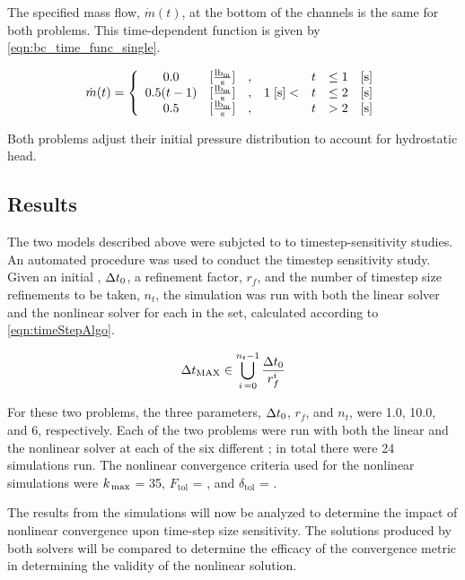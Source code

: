 The specified mass flow, $\dot{m}(t)$, at the bottom of the channels is the same for both problems. 
This time-dependent function is given by \eqref{eqn:bc_time_func_single}.

\begin{equation}
\label{eqn:bc_time_func_single}
\dot{m}(t) = \left\{
\begin{array}{cclrcll}
 0.0           & [\frac{ \lbm{} }{\text{s}}] & , &                & t & \leq 1 & [\text{s}] \\
 0.5 ( t - 1)  & [\frac{ \lbm{} }{\text{s}}] & , & 1\; [\text{s}] < & t & \leq 2 & [\text{s}] \\
 0.5           & [\frac{ \lbm{} }{\text{s}}] & , &                & t & > 2    & [\text{s}]
\end{array}\right.
\end{equation}

Both problems adjust their initial pressure distribution to account for hydrostatic head.

\subsection{Results}
\label{subsect:single_results}

The two models described above were subjcted to to timestep-sensitivity studies.
An automated procedure was used to conduct the timestep sensitivity study.
Given an initial \dtmax{}, $\dt{}_{0}$, a refinement factor, $r_{f}$, and the number of timestep size refinements to be taken, $n_{t}$, the simulation was run with both the linear solver and the nonlinear solver for each \dtmax{} in the set, calculated according to \eqref{eqn:timeStepAlgo}.

\begin{equation}
\label{eqn:timeStepAlgo}
\dtmax{} \in \bigcup^{n_{t}-1}_{i\, = 0} \frac{\dt{}_{0}}{r^{i}_{f}}
\end{equation}

For these two problems, the three parameters, $\dt{}_{0}$, $r_{f}$, and $n_{t}$, were 1.0, 10.0, and 6, respectively.
Each of the two problems were run with both the linear and the nonlinear solver at each of the six different \dtmax{}; in total there were 24 simulations run.
The nonlinear convergence criteria used for the nonlinear simulations were $\kmax$ = 35, $F_{\text{tol}}$ = , and $\delta_{\text{tol}}$ = .

The results from the simulations will now be analyzed to determine the impact of nonlinear convergence upon time-step size sensitivity.
The solutions produced by both solvers will be compared to determine the efficacy of the convergence metric in determining the validity of the nonlinear solution.

